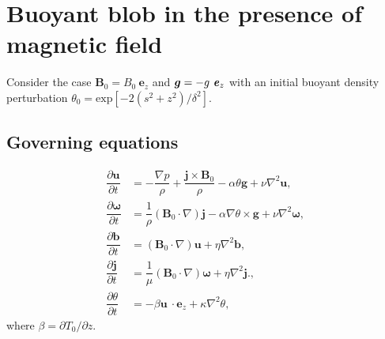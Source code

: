 \documentclass[12pt,psfig]{article}
\begin{document}
\section{Buoyant blob in the presence of magnetic field }
Consider the case  $\bm  B_0=B_0 \ \bm e_z$ and $\boldsymbol{ g}=-g \ \textbf{\textit{e}}_z$ with an initial buoyant density perturbation $\theta_0 =  \text{exp}[-2(s^2+z^2)/\delta^2]$.

\subsection{Governing equations}
\begin{align}
\dfrac{\partial \bm u}{\partial t}&=-\dfrac{\nabla p}{\rho}+\dfrac{\bm j \times \bm B_0}{\rho} -\alpha \theta \bm g+\nu\nabla^2\bm u, \label{u_eqn}\\
\dfrac{\partial\bm \omega}{\partial t}&=\dfrac{1}{\rho}(\bm B_0\cdot \nabla)\bm j-\alpha\nabla\theta \times \bm g+\nu\nabla^2\bm \omega, \label{w_eqn}\\ 
\dfrac{\partial \bm b}{\partial t}&=(\bm B_0\cdot \nabla)\bm u+\eta \nabla^2\bm b,\label{b_eqn} \\ 
\dfrac{\partial \bm j}{\partial t}&=\dfrac{1}{\mu}(\bm B_0\cdot \nabla)\bm \omega+\eta \nabla^2\bm j.\label{j_eqn}, \\
\dfrac{\partial  \theta}{\partial t}&=-\beta \bm u\ \cdot \bm e_z+\kappa \nabla^2\theta,\label{rho_eqn}
\end{align}
where $\beta=\partial T_0/\partial z$.
\end{document}
